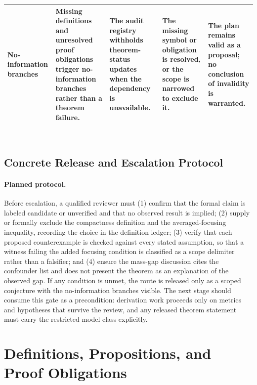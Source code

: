 \documentclass[conference]{IEEEtran}
\begin{document}
\begin{table}[htbp]
\begin{tabular}{|p{}|p{}|p{}|p{}|p{}|}
No-information branches & Missing definitions and unresolved proof obligations trigger no-information branches rather than a theorem failure. & The audit registry withholds theorem-status updates when the dependency is unavailable. & The missing symbol or obligation is resolved, or the scope is narrowed to exclude it. & The plan remains valid as a proposal; no conclusion of invalidity is warranted. \\\hline
\end{tabular}
\end{table}~\cite{cite_0ed84243cf171bc4}

\subsection{Concrete Release and Escalation Protocol}
\paragraph{Planned protocol.} Before escalation, a qualified reviewer must (1) confirm that the formal claim is labeled candidate or unverified and that no observed result is implied; (2) supply or formally exclude the compactness definition and the averaged-focusing inequality, recording the choice in the definition ledger; (3) verify that each proposed counterexample is checked against every stated assumption, so that a witness failing the added focusing condition is classified as a scope delimiter rather than a falsifier; and (4) ensure the mass-gap discussion cites the confounder list and does not present the theorem as an explanation of the observed gap. If any condition is unmet, the route is released only as a scoped conjecture with the no-information branches visible. The next stage should consume this gate as a precondition: derivation work proceeds only on metrics and hypotheses that survive the review, and any released theorem statement must carry the restricted model class explicitly.

\section{Definitions, Propositions, and Proof Obligations}
\end{document}
